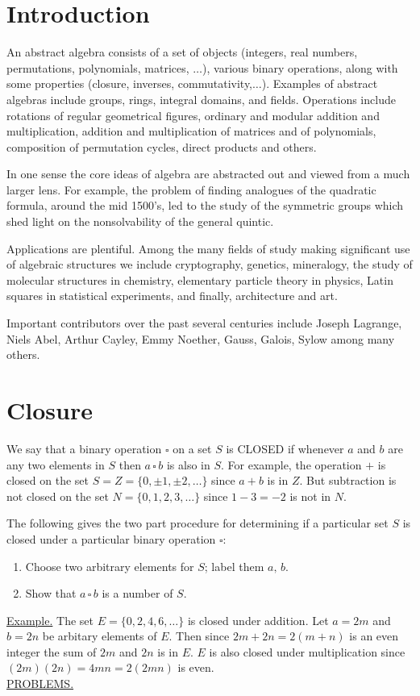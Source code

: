 \documentclass[12pt]{book}
\theoremstyle{definition}
\begin{document}
\pagestyle{fancy}

\section*{Introduction}
An abstract algebra consists of a set of objects (integers, real numbers, permutations, polynomials, matrices, $\dots$), various binary operations, along with some properties (closure, inverses, commutativity,$\dots$). Examples of abstract algebras include groups, rings, integral domains, and fields. Operations include rotations of regular geometrical figures, ordinary and modular addition and multiplication, addition and multiplication of matrices and of polynomials, composition of permutation cycles, direct products and others.

In one sense the core ideas of algebra are abstracted out and viewed from a much larger lens. For example, the problem of finding analogues of the quadratic formula, around the mid 1500’s, led to the study of the symmetric groups which shed light on the nonsolvability of the general quintic.

Applications are plentiful. Among the many fields of study making significant use of algebraic structures we include cryptography, genetics, mineralogy, the study of molecular structures in chemistry, elementary particle theory in physics, Latin squares in statistical experiments, and finally, architecture and art.

Important contributors over the past several centuries include Joseph Lagrange, Niels Abel, Arthur Cayley, Emmy Noether, Gauss, Galois, Sylow among many others.
\cleardoublepage

\section{Closure}

\quad We say that a binary operation $\square$ on a set $S$ is CLOSED if whenever $a$ and $b$ are any two elements in $S$ then $a\,\square\, b$ is also in $S$.  For example, the operation $+$ is closed on the set $S=Z=\{0,\pm1,\pm2,\dots\}$ since $a+b$ is in $Z$.  But subtraction is not closed on the set $N=\{0,1,2,3,\dots\}$ since $1-3=-2$ is not in $N$.

The following gives the two part procedure for determining if a particular set $S$ is closed under a particular binary operation $\square$:
\begin{enumerate}
\item Choose two arbitrary elements for $S$; label them $a,\,b$.
\item Show that $a\,\square\, b$ is a number of $S$.
\end{enumerate}
\underline{Example.} The set $E=\{0,2,4,6,\dots\}$ is closed under addition.  Let $a=2m$ and $b=2n$ be arbitary elements of $E$.  Then since $2m+2n=2(m+n)$ is an even integer the sum of $2m$ and $2n$ is in $E$.  $E$ is also closed under multiplication since $(2m)(2n)=4mn=2(2mn)$ is even.\\[.1 in]
\underline{PROBLEMS.}
\end{document}

